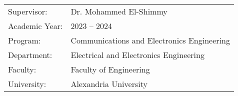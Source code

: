 \begin{titlepage}
\begin{center}
\vfill

\begin{tabular}{ll}
    {Supervisor:} & {Dr. Mohammed El-Shimmy} \\
    {Academic Year}: & {2023 -- 2024} \\
    {Program:} & {Communications and Electronics Engineering} \\
    {Department:} & {Electrical and Electronics Engineering} \\
    {Faculty:} & {Faculty of Engineering} \\
    {University:} & {Alexandria University}
\end{tabular}


\end{center}








\end{titlepage}

